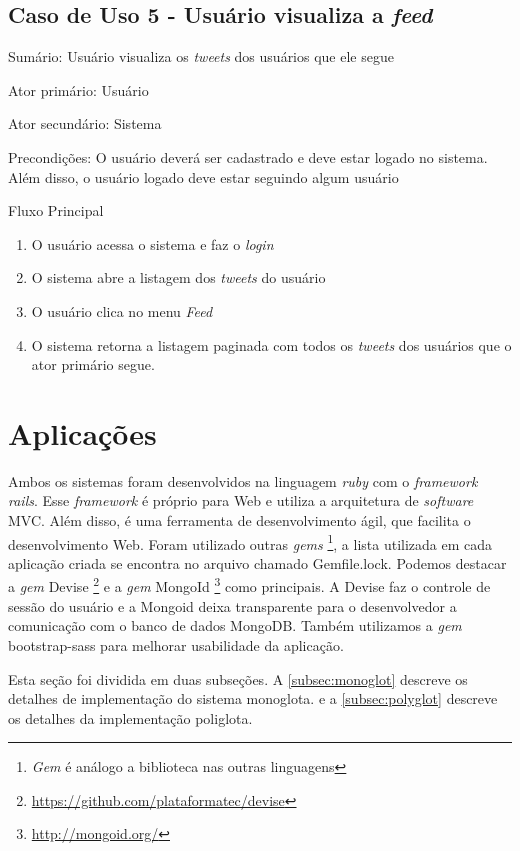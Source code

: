 \subsection{Caso de Uso 5 - Usuário visualiza a \textit{feed}}
\label{subsec:useCaseFeed}

Sumário: Usuário visualiza os \textit{tweets} dos usuários que ele segue

Ator primário: Usuário

Ator secundário: Sistema

Precondições: O usuário deverá ser cadastrado e deve estar logado no sistema. Além disso, o usuário logado deve estar seguindo algum usuário

Fluxo Principal
\begin{enumerate}
\item O usuário acessa o sistema e faz o \textit{login}
\item O sistema abre a listagem dos \textit{tweets} do usuário
\item O usuário clica no menu \textit{Feed}
\item O sistema retorna a listagem paginada com todos os \textit{tweets} dos usuários que o ator primário segue.
\end{enumerate}


\section{Aplicações}
\label{sec:applications}

Ambos os sistemas foram desenvolvidos na linguagem \textit{ruby} com o \textit{framework rails}. Esse \textit{framework} é próprio para Web e utiliza a arquitetura de \textit{software} \ac{MVC}. Além disso, é uma ferramenta de desenvolvimento ágil, que facilita o desenvolvimento Web.
Foram utilizado outras \textit{gems} \footnote{\textit{Gem} é análogo a biblioteca nas outras linguagens}, a lista utilizada em cada aplicação criada se encontra no arquivo chamado Gemfile.lock. Podemos destacar a \textit{gem} Devise \footnote{\url{https://github.com/plataformatec/devise}} e a \textit{gem} MongoId \footnote{\url{http://mongoid.org/}} como principais. A Devise faz o controle de sessão do usuário e a Mongoid deixa transparente para o desenvolvedor a comunicação com o banco de dados MongoDB. Também utilizamos a \textit{gem} bootstrap-sass para melhorar usabilidade da aplicação.

Esta seção foi dividida em duas subseções. A \autoref{subsec:monoglot} descreve os detalhes de implementação do sistema monoglota. e a \autoref{subsec:polyglot}  descreve os detalhes da implementação poliglota.

